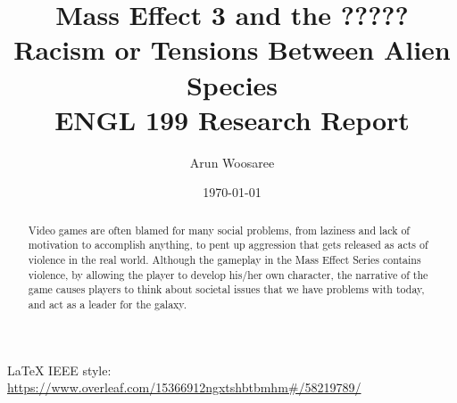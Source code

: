 \documentclass[journal]{IEEEtran}
\title{Mass Effect 3 and the ????? Racism or Tensions Between Alien Species\\
\vspace{.25cm}\large ENGL 199 Research Report \vspace{-.5cm}}
\author{\LARGE Arun Woosaree}
\date{\today}
\begin{document}
\maketitle %

\begin{abstract}
 Video games are often blamed for many social problems, from laziness and lack of motivation to accomplish anything, to pent up aggression that gets released as acts of violence in the real world. Although the gameplay in the Mass Effect Series contains violence, by allowing the player to develop his/her own character, the narrative of the game causes players to think about societal issues that we have problems with today, and act as a leader for the galaxy.
\end{abstract}

\LaTeX{} IEEE style:
\url{https://www.overleaf.com/15366912ngxtshbtbmhm#/58219789/}
\end{document}
